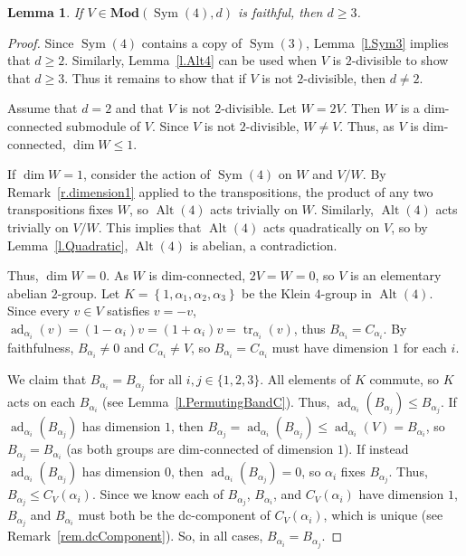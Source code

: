 \documentclass[a4paper, 11pt]{amsart}
\theoremstyle{plain}
\newtheorem{lemma}[theorem]{Lemma}
\theoremstyle{definition}
\theoremstyle{remark}
\DeclareMathOperator{\ad}{ad}
\DeclareMathOperator{\tr}{tr}
\DeclareMathOperator{\Sym}{Sym}
\DeclareMathOperator{\Alt}{Alt}
\newcommand{\Mod}{\mathbf{Mod}}
\begin{document}
\begin{lemma}\label{l.Sym4}
If $V \in \Mod(\Sym(4), d)$ is faithful, then $d \ge 3$. 
\end{lemma}
\begin{proof}
Since $\Sym(4)$ contains a copy of $\Sym(3)$, Lemma~\ref{l.Sym3} implies that $d\ge2$. Similarly, Lemma~\ref{l.Alt4} can be used when $V$ is $2$-divisible to show that $d \ge 3$. 
Thus it remains to show that if $V$ is not $2$-divisible, then $d \neq 2$.

Assume that $d = 2$ and that $V$ is not $2$-divisible. Let $W=2V$. Then $W$ is a dim-connected submodule of $V$. Since $V$ is not $2$-divisible,  $W\neq V$. Thus, as $V$ is dim-connected, $\dim W \le 1$. 

If $\dim W = 1$, consider the action of $\Sym(4)$ on $W$ and $V/W$. By Remark~\ref{r.dimension1} applied to the transpositions, the product of any two transpositions fixes $W$, so $\Alt(4)$ acts trivially on $W$. Similarly, $\Alt(4)$ acts trivially on $V/W$. This implies that  $\Alt(4)$ acts quadratically on $V$, so by Lemma~\ref{l.Quadratic}, $\Alt(4)$ is abelian, a contradiction.

Thus, $\dim W = 0$. As $W$ is dim-connected, $2V = W = 0$, so $V$ is an elementary abelian $2$-group. Let $K = \left\{1, \alpha_{1},\alpha_{2},\alpha_{3}\right\}$ be the  Klein $4$-group in $\Alt(4)$. Since every $v\in V$ satisfies $v=-v$, $\ad_{\alpha_i}(v)=(1-\alpha_i)v=(1+\alpha_i)v=\tr_{\alpha_i}(v)$, thus $B_{\alpha_i} = C_{\alpha_i}$. By faithfulness, $B_{\alpha_i} \neq 0$ and $C_{\alpha_i} \ne V$, so $B_{\alpha_i} = C_{\alpha_i}$ must have dimension $1$ for each $i$. 

We claim that $B_{\alpha_i} = B_{\alpha_j}$ for all $i,j\in \{1,2,3\}$. All elements of $K$ commute, so $K$ acts on each $B_{\alpha_i}$ (see Lemma~\ref{l.PermutingBandC}). Thus, 
 $\ad_{\alpha_i}(B_{\alpha_j})\le B_{\alpha_j}$. If $\ad_{\alpha_i}(B_{\alpha_j})$ has dimension $1$, then $B_{\alpha_j}=\ad_{\alpha_i}(B_{\alpha_j})\le\ad_{\alpha_i}(V)=B_{\alpha_i}$, so  $B_{\alpha_j}=B_{\alpha_i}$ (as both groups are dim-connected of dimension $1$). 
 If instead $\ad_{\alpha_i}(B_{\alpha_j})$ has dimension $0$, then $\ad_{\alpha_i}(B_{\alpha_j})=0$, so $\alpha_i$ fixes $B_{\alpha_j}$. Thus, $B_{\alpha_j} \le C_V(\alpha_i)$.
Since we  know each of $B_{\alpha_j}$, $B_{\alpha_i}$, and $C_V(\alpha_i)$ have dimension $1$, $B_{\alpha_j}$ and $B_{\alpha_i}$ must both be the dc-component of $C_V(\alpha_i)$, which is unique (see Remark~\ref{rem.dcComponent}). So, in all cases, $B_{\alpha_i} = B_{\alpha_j}$.


\end{proof}
\end{document}
